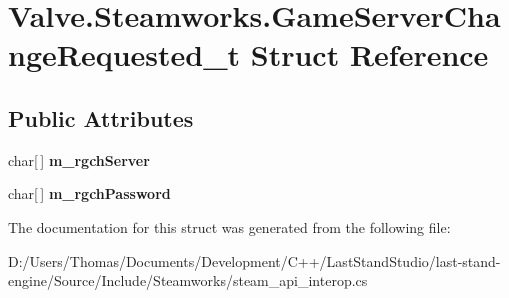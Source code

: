 \hypertarget{structValve_1_1Steamworks_1_1GameServerChangeRequested__t}{}\section{Valve.\+Steamworks.\+Game\+Server\+Change\+Requested\+\_\+t Struct Reference}
\label{structValve_1_1Steamworks_1_1GameServerChangeRequested__t}
\subsection*{Public Attributes}
\begin{DoxyCompactItemize}
\item 
\hypertarget{structValve_1_1Steamworks_1_1GameServerChangeRequested__t_a4d6ae1d576b5b19c51155f11c6426d7b}{}char\mbox{[}$\,$\mbox{]} {\bfseries m\+\_\+rgch\+Server}\label{structValve_1_1Steamworks_1_1GameServerChangeRequested__t_a4d6ae1d576b5b19c51155f11c6426d7b}

\item 
\hypertarget{structValve_1_1Steamworks_1_1GameServerChangeRequested__t_adaeb6906c6e51ef5043a89fa1adf69e2}{}char\mbox{[}$\,$\mbox{]} {\bfseries m\+\_\+rgch\+Password}\label{structValve_1_1Steamworks_1_1GameServerChangeRequested__t_adaeb6906c6e51ef5043a89fa1adf69e2}

\end{DoxyCompactItemize}


The documentation for this struct was generated from the following file\+:\begin{DoxyCompactItemize}
\item 
D\+:/\+Users/\+Thomas/\+Documents/\+Development/\+C++/\+Last\+Stand\+Studio/last-\/stand-\/engine/\+Source/\+Include/\+Steamworks/steam\+\_\+api\+\_\+interop.\+cs\end{DoxyCompactItemize}
